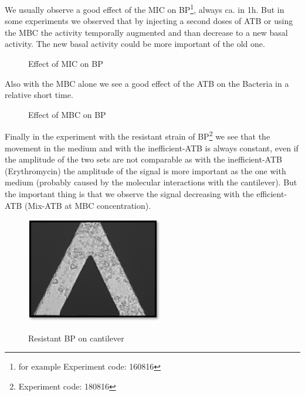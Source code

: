 \documentclass[11pt, a4paper]{article}
\begin{document}

We usually observe a good effect of the MIC on BP\footnote{for example Experiment code: 160816}, always ca. in 1h. But in some experiments we observed that by injecting a second doses of ATB or using the MBC the activity temporally augmented and than decrease to a new basal activity. The new basal activity could be more important of the old one. 
\begin{figure}[h]
\centering
\label{}
\caption{Effect of MIC on BP}
\end{figure}

Also with the MBC alone we see a good effect of the ATB on the Bacteria in a relative short time. 
\begin{figure}[h]
\centering
\label{}
\caption{Effect of MBC on BP}
\end{figure}


Finally in the experiment with the resistant strain of BP\footnote{Experiment code: 180816} we see that the movement in the medium and with the inefficient-ATB is always constant, even if the amplitude of the two sets are not comparable as with the inefficient-ATB (Erythromycin) the amplitude of the signal is more important as the one with medium (probably caused by the molecular interactions with the cantilever). But the important thing is that we observe the signal decreasing with the efficient-ATB (Mix-ATB at MBC concentration).

\begin{figure}[h]
\centering
\includegraphics[width=0.3\linewidth]{Cantilever/Can180816.jpg}
\label{}
\caption{Resistant BP on cantilever}
\end{figure}
\end{document}
